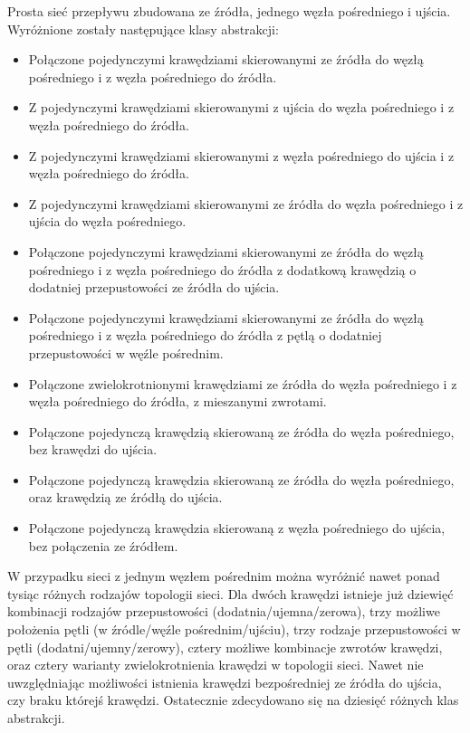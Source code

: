 \documentclass[10pt]{dokument-tiwo}
\begin{document}
Prosta sieć przepływu zbudowana ze źródła, jednego węzła pośredniego i ujścia. Wyróżnione zostały następujące klasy abstrakcji:
\begin{itemize}
    \item Połączone pojedynczymi krawędziami skierowanymi ze źródła do węzłą pośredniego i z węzła pośredniego do źródła.
    \item Z pojedynczymi krawędziami skierowanymi z ujścia do węzła pośredniego i z węzła pośredniego do źródła.
    \item Z pojedynczymi krawędziami skierowanymi z węzła pośredniego do ujścia i z węzła pośredniego do źródła.
    \item Z pojedynczymi krawędziami skierowanymi ze źródła do węzła pośredniego i z ujścia do węzła pośredniego.
    \item Połączone pojedynczymi krawędziami skierowanymi ze źródła do węzłą pośredniego i z węzła pośredniego do źródła z dodatkową krawędzią o dodatniej przepustowości ze źródła do ujścia.
    \item Połączone pojedynczymi krawędziami skierowanymi ze źródła do węzłą pośredniego i z węzła pośredniego do źródła z pętlą o dodatniej przepustowości w węźle pośrednim.
    \item Połączone zwielokrotnionymi krawędziami ze źródła do węzła pośredniego i z węzła pośredniego do źródła, z mieszanymi zwrotami.
    \item Połączone pojedynczą krawędzią skierowaną ze źródła do węzła pośredniego, bez krawędzi do ujścia.
    \item Połączone pojedynczą krawędzia skierowaną ze źródła do węzła pośredniego, oraz krawędzią ze źródłą do ujścia.
    \item Połączone pojedynczą krawędzia skierowaną z węzła pośredniego do ujścia, bez połączenia ze źródłem.

\end{itemize}
W przypadku sieci z jednym węzłem pośrednim można wyróżnić nawet ponad tysiąc różnych rodzajów topologii sieci. Dla dwóch krawędzi istnieje już dziewięć kombinacji rodzajów przepustowości (dodatnia/ujemna/zerowa), trzy możliwe położenia pętli (w źródle/węźle pośrednim/ujściu), trzy rodzaje przepustowości w pętli (dodatni/ujemny/zerowy), cztery możliwe kombinacje zwrotów krawędzi, oraz cztery warianty zwielokrotnienia krawędzi w topologii sieci. Nawet nie uwzględniając możliwości istnienia krawędzi bezpośredniej ze źródła do ujścia, czy braku którejś krawędzi. Ostatecznie zdecydowano się na dziesięć różnych klas abstrakcji.
\end{document}
